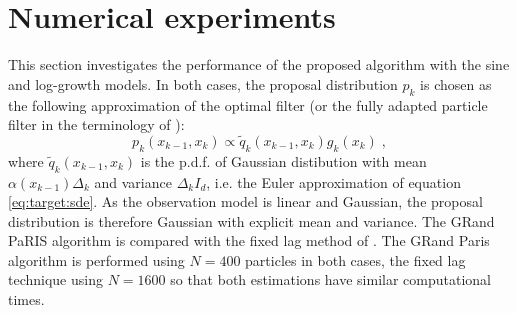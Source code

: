 \documentclass[12pt]{article}
\newcommand{\eqsp}{\;}
\newcommand{\1}{\mathrm{1}}
\begin{document}
\section{Numerical experiments}
\label{sec:exp}
This section investigates the performance of the proposed algorithm with the sine and log-growth models. In both cases, the proposal distribution $p_k$ is chosen as the following approximation of the optimal filter (or the fully adapted particle filter in the terminology of \cite{pitt:shephard:1999}): 
$$p_k(x_{k-1},x_k)\propto \tilde{q}_k(x_{k-1}, x_k)g_k(x_{k})\eqsp,$$
where $\tilde{q}_k(x_{k-1},x_k)$ is the p.d.f. of Gaussian distibution with mean $\alpha(x_{k-1})\Delta_k$ and variance $\Delta_kI_d$, i.e. the Euler approximation of equation \eqref{eq:target:sde}. As the observation model is linear and Gaussian, the proposal distribution is therefore Gaussian with explicit mean and variance. The GRand PaRIS algorithm is compared with the fixed lag method of \cite{olsson:strojby:2011}. The GRand Paris algorithm is performed using $N=400$ particles in both cases, the fixed lag technique using $N=1600$ so that both estimations have similar computational times.
\end{document}
